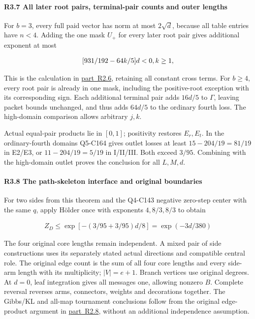 \paragraph{R3.7 All later root pairs, terminal-pair counts and outer lengths}

For \(b=3\), every full paid vector has norm at most \(2\sqrt d\), because all table entries have \(n<4\). Adding the one mask \(U_+\) for every later root pair gives additional exponent at most

\[
\begin{gathered}
\relax [931/192-64k/5]d<0,k\ge 1,
\end{gathered}
\]

This is the calculation in \mbox{\hyperref[part:R2.6]{part R2.6}}, retaining all constant cross terms. For \(b\ge4\), every root pair is already in one mask, including the positive-root exception with its corresponding sign. Each additional terminal pair adds \(16d/5\) to \(\Gamma\), leaving packet bounds unchanged, and thus adds \(64d/5\) to the ordinary fourth loss. The high-domain comparison allows arbitrary \(j,\allowbreak \allowbreak  k\).

Actual equal-pair products lie in \([0,\allowbreak \allowbreak  1]\); positivity restores \(E_r,\allowbreak \allowbreak  E_t\). In the ordinary-fourth domains Q5-C164 gives outlet losses at least \(15-204/19=81/19\) in E2/E3, or \(11-204/19=5/19\) in I/II/III. Both exceed \(3/95\). Combining with the high-domain outlet proves the conclusion for all \(L,\allowbreak \allowbreak  M,\allowbreak \allowbreak  d\).

\paragraph{R3.8 The path-skeleton interface and original boundaries}

For two sides from this theorem and the Q4-C143 negative zero-step center with the same \(q\), apply Hölder once with exponents \(4,\allowbreak \allowbreak  8/3,\allowbreak \allowbreak  8/3\) to obtain

\[
\begin{gathered}
Z_D\le \exp[-(3/95+3/95)d/8]=\exp(-3d/380) 
\end{gathered}\tag{R3.8.1}
\]

The four original core lengths remain independent. A mixed pair of side constructions uses its separately stated actual directions and compatible central role. The original edge count is the sum of all four core lengths and every side-arm length with its multiplicity; \(|V|=e+1\). Branch vertices use original degrees. At \(d=0\), leaf integration gives all messages one, allowing nonzero \(B\). Complete reversal reverses arms, connectors, weights and decorations together. The Gibbs/KL and all-map tournament conclusions follow from the original edge-product argument in \mbox{\hyperref[part:R2.8]{part R2.8}}, without an additional independence assumption.

